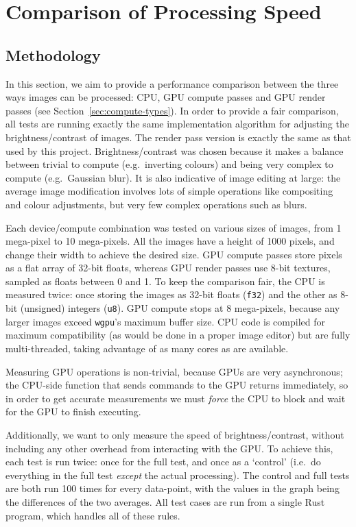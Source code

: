 \documentclass[12pt]{article}
\begin{document}
\pagebreak

\section{Comparison of Processing Speed}\label{sec:measurements}

\subsection{Methodology}

In this section, we aim to provide a performance comparison between the three ways images can be
processed: CPU, GPU compute passes and GPU render passes (see Section~\ref{sec:compute-types}).  In
order to provide a fair comparison, all tests are running exactly the same implementation algorithm
for adjusting the brightness/contrast of images.  The render pass version is exactly the same as
that used by this project.  Brightness/contrast was chosen because it makes a balance between
trivial to compute (e.g.\ inverting colours) and being very complex to compute (e.g.\ Gaussian
blur).  It is also indicative of image editing at large: the average image modification involves
lots of simple operations like compositing and colour adjustments, but very few complex operations
such as blurs.

Each device/compute combination was tested on various sizes of images, from 1 mega-pixel to 10
mega-pixels.  All the images have a height of 1000 pixels, and change their width to achieve the
desired size.  GPU compute passes store pixels as a flat array of 32-bit floats, whereas GPU render
passes use 8-bit textures, sampled as floats between 0 and 1.  To keep the comparison fair, the CPU
is measured twice: once storing the images as 32-bit floats (\verb|f32|) and the other as 8-bit
(unsigned) integers (\verb|u8|).  GPU compute stops at 8 mega-pixels, because any larger images
exceed \verb|wgpu|'s maximum buffer size.  CPU code is compiled for maximum compatibility (as would
be done in a proper image editor) but are fully multi-threaded, taking advantage of as many cores as
are available.

Measuring GPU operations is non-trivial, because GPUs are very asynchronous; the CPU-side function
that sends commands to the GPU returns immediately, so in order to get accurate measurements we must
\emph{force} the CPU to block and wait for the GPU to finish executing.

Additionally, we want to only measure the speed of brightness/contrast, without including any other
overhead from interacting with the GPU.  To achieve this, each test is run twice: once for the full
test, and once as a `control' (i.e.\ do everything in the full test \emph{except} the actual
processing).  The control and full tests are both run 100 times for every data-point, with the
values in the graph being the differences of the two averages.  All test cases are run from a single
Rust program, which handles all of these rules.
\end{document}
